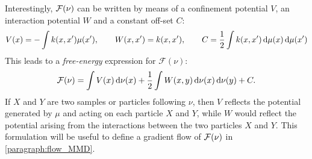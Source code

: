  Interestingly, ${{\mathcal F}}(\nu)$ can be written by means of a confinement potential $V$, an interaction potential $W$ and a constant off-set $C$:
\begin{align}\label{eq:potentials}
V(x)=-\int  k(x,x')\mu(x'), \qquad
W(x,x')=k(x,x'), \qquad
C = \frac{1}{2} \int k(x,x')\mathop{}\!\mathrm{d}\mu(x) \mathop{}\!\mathrm{d}\mu(x') 
\end{align}
This leads to a \textit{free-energy} expression for $\mathcal{F}(\nu)$:
\begin{align}\label{eq:mmd_as_free_energy}
	{{\mathcal F}}(\nu) = \int V(x) \mathop{}\!\mathrm{d} \nu(x) +\frac{1}{2} \int W(x,y)\mathop{}\!\mathrm{d} \nu(x)\mathop{}\!\mathrm{d} \nu(y) + C.
\end{align}
If $X$ and $Y$ are two samples or particles following $\nu$, then $V$ reflects the potential generated by $\mu$ and acting on each particle $X$ and $Y$, while $W$ would reflect the potential arising from the interactions between the two particles $X$ and $Y$. This formulation will be useful to define a gradient flow of ${{\mathcal F}}(\nu)$ in \cref{paragraph:flow_MMD}. 
